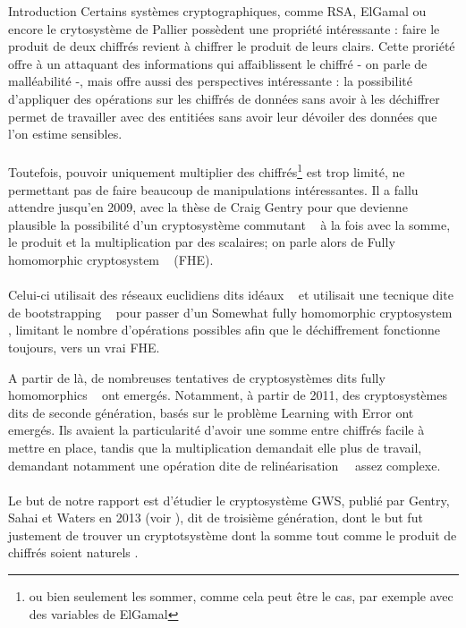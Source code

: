 \begin{section}{Introduction}
	Certains systèmes cryptographiques, comme RSA, ElGamal ou encore le crytosystème de Pallier possèdent une propriété intéressante : faire le produit de deux chiffrés revient à chiffrer le produit de leurs clairs. Cette proriété offre à un attaquant des informations qui affaiblissent le chiffré - on parle de malléabilité -, mais offre aussi des perspectives intéressante : la possibilité d'appliquer des opérations sur les chiffrés de données sans avoir à les déchiffrer permet de travailler avec des entitiées sans avoir leur dévoiler des données que l'on estime sensibles.

	\paragraph{}
	Toutefois, pouvoir uniquement multiplier des chiffrés\footnote{ou bien seulement les sommer, comme cela peut être le cas, par exemple avec des variables de ElGamal} est trop limité, ne permettant pas de faire beaucoup de manipulations intéressantes. Il a fallu attendre jusqu'en 2009, avec la thèse de Craig Gentry \cite{gentry_thesis} pour que devienne plausible la possibilité d'un cryptosystème \og commutant \fg~ à la fois avec la somme, le produit et la multiplication par des scalaires; on parle alors de \og Fully homomorphic cryptosystem \fg~ (FHE).

	\paragraph{}
	Celui-ci utilisait des réseaux euclidiens dits \og idéaux \fg~ et utilisait une tecnique dite de \og bootstrapping \fg~ pour passer d'un \og Somewhat fully homomorphic cryptosystem \fg, limitant le nombre d'opérations possibles afin que le déchiffrement fonctionne toujours, vers un vrai FHE.

	A partir de là, de nombreuses tentatives de cryptosystèmes dits \og fully homomorphics \fg~ ont emergés. Notamment, à partir de 2011, des cryptosystèmes dits de seconde	génération, basés sur le problème Learning with Error ont emergés. Ils avaient la particularité d'avoir une somme entre chiffrés facile à mettre en place, tandis que la multiplication demandait elle plus de travail, demandant notamment une opération dite de \og relinéarisation \fg~ assez complexe.

	\paragraph{}
	Le but de notre rapport est d'étudier le cryptosystème GWS, publié par Gentry, Sahai et Waters en 2013 (voir \cite{EPRINT:GenSahWat13}), dit de troisième génération, dont le but fut justement de trouver un cryptotsystème dont la somme tout comme le produit de chiffrés soient \og naturels \fg.


\end{section}
